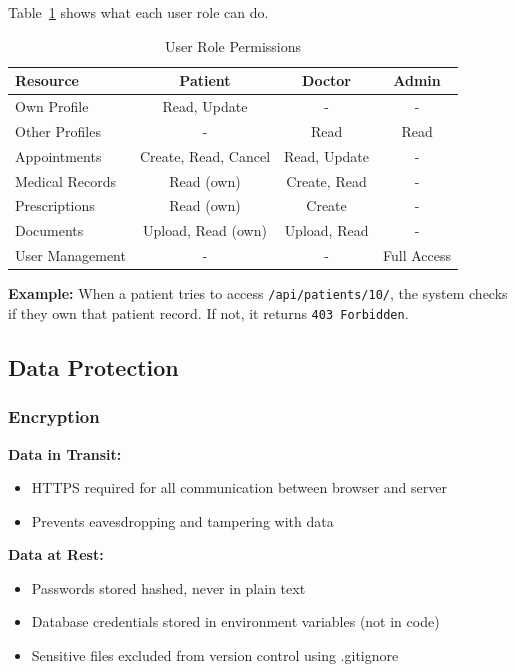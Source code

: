 \documentclass[11pt,a4paper]{article}
\begin{document}
Table~\ref{tab:access-control} shows what each user role can do.

\begin{table}[htbp]
\centering
\small
\begin{tabular}{|l|c|c|c|}
\hline
\textbf{Resource} & \textbf{Patient} & \textbf{Doctor} & \textbf{Admin} \\
\hline
Own Profile & Read, Update & - & - \\
Other Profiles & - & Read & Read \\
Appointments & Create, Read, Cancel & Read, Update & - \\
Medical Records & Read (own) & Create, Read & - \\
Prescriptions & Read (own) & Create & - \\
Documents & Upload, Read (own) & Upload, Read & - \\
User Management & - & - & Full Access \\
\hline
\end{tabular}
\caption{User Role Permissions}
\label{tab:access-control}
\end{table}
\noindent
\textbf{Example:} When a patient tries to access \texttt{/api/patients/10/}, the system checks if they own that patient record. If not, it returns \texttt{403 Forbidden}.

\subsection{Data Protection}

\subsubsection{Encryption}

\textbf{Data in Transit:}
\begin{itemize}
    \item HTTPS required for all communication between browser and server
    \item Prevents eavesdropping and tampering with data
\end{itemize}
\noindent
\textbf{Data at Rest:}
\begin{itemize}
    \item Passwords stored hashed, never in plain text
    \item Database credentials stored in environment variables (not in code)
    \item Sensitive files excluded from version control using .gitignore
\end{itemize}
\end{document}

